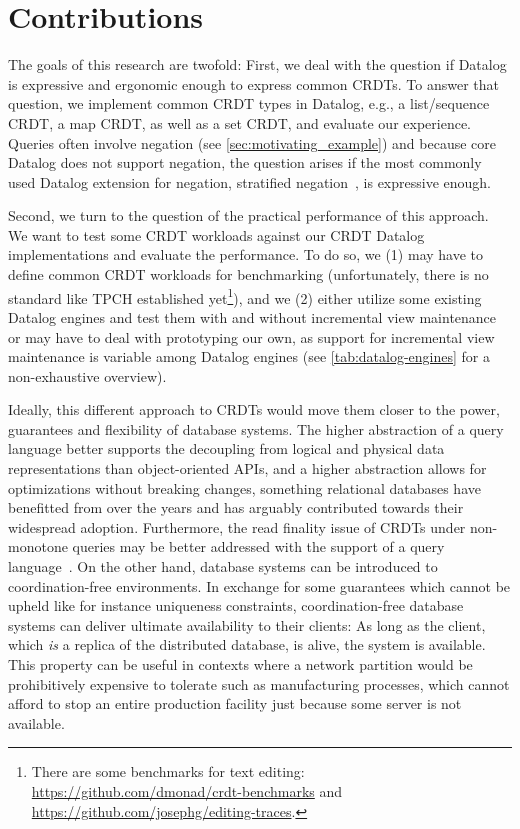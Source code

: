 \documentclass{article}
\begin{document}
\section{Contributions}
\label{sec:problem_stmnt}

The goals of this research are twofold:
First, we deal with the question if Datalog is expressive and ergonomic enough
to express common CRDTs.
To answer that question, we implement common CRDT types in Datalog, e.g.,
a list/sequence CRDT, a map CRDT, as well as a set CRDT,
and evaluate our experience.
Queries often involve negation (see \autoref{sec:motivating_example})
and because core Datalog does not support negation, the question arises if
the most commonly used Datalog extension for negation,
stratified negation~\cite{green2013datalog}, is expressive enough.

Second, we turn to the question of the practical performance of this approach.
We want to test some CRDT workloads against our CRDT Datalog implementations and
evaluate the performance.
To do so, we (1) may have to define common CRDT workloads for benchmarking
(unfortunately, there is no standard like TPCH established yet\footnote{
	There are some benchmarks for text editing:
	\url{https://github.com/dmonad/crdt-benchmarks} and
	\url{https://github.com/josephg/editing-traces}.
}), and we (2) either utilize some existing Datalog engines and test them
with and without incremental view maintenance or may have to deal with
prototyping our own, as support for incremental view maintenance is variable
among Datalog engines
(see \autoref{tab:datalog-engines} for a non-exhaustive overview).

Ideally, this different approach to CRDTs would move them closer to the power,
guarantees and flexibility of database systems.
The higher abstraction of a query language better supports the decoupling from
logical and physical data representations than object-oriented APIs,
and a higher abstraction allows for optimizations without breaking changes,
something relational databases have benefitted from over the years and has
arguably contributed towards their widespread adoption.
Furthermore, the read finality issue of CRDTs under non-monotone queries
may be better addressed with the support of a query language~\cite{laddad2022keep}.
On the other hand, database systems can be introduced to coordination-free
environments.
In exchange for some guarantees which cannot be upheld
like for instance uniqueness constraints,
coordination-free database systems can deliver ultimate availability
to their clients:
As long as the client, which \emph{is} a replica of the distributed database,
is alive, the system is available.
This property can be useful in contexts where a network partition would be
prohibitively expensive to tolerate such as manufacturing processes,
which cannot afford to stop an entire production facility just because
some server is not available.
\end{document}
